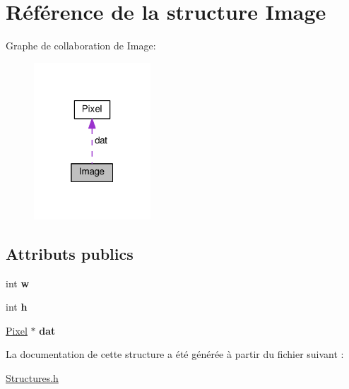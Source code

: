 \hypertarget{structImage}{}\section{Référence de la structure Image}
\label{structImage}


Graphe de collaboration de Image\+:
\nopagebreak
\begin{figure}[H]
\begin{center}
\leavevmode
\includegraphics[width=124pt]{structImage__coll__graph}
\end{center}
\end{figure}
\subsection*{Attributs publics}
\begin{DoxyCompactItemize}
\item 
int {\bfseries w}\hypertarget{structImage_a5a1c5528c889b0438bc2dc0c0ee94dbe}{}\label{structImage_a5a1c5528c889b0438bc2dc0c0ee94dbe}

\item 
int {\bfseries h}\hypertarget{structImage_aead13dbc461159381773fff06824e651}{}\label{structImage_aead13dbc461159381773fff06824e651}

\item 
\hyperlink{structPixel}{Pixel} $\ast$ {\bfseries dat}\hypertarget{structImage_abc032a260e391b03f825917716eb07b7}{}\label{structImage_abc032a260e391b03f825917716eb07b7}

\end{DoxyCompactItemize}


La documentation de cette structure a été générée à partir du fichier suivant \+:\begin{DoxyCompactItemize}
\item 
\hyperlink{Structures_8h}{Structures.\+h}\end{DoxyCompactItemize}
